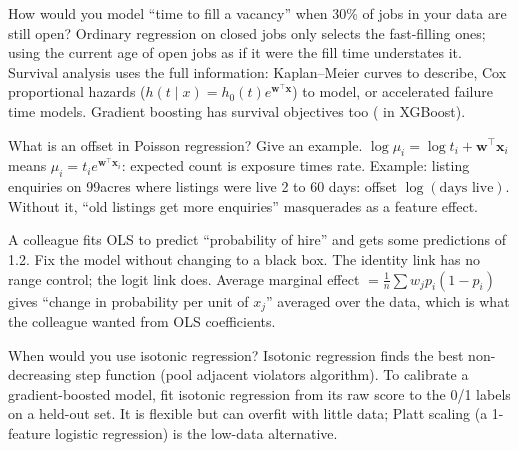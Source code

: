 \begin{qa}{\deep How would you model ``time to fill a vacancy'' when 30\% of jobs in your data are still open?}
\why Ordinary regression on closed jobs only selects the fast-filling ones; using the current age of open jobs as if it were
the fill time understates it. Survival analysis uses the full information: Kaplan--Meier curves to describe, Cox proportional
hazards ($h(t\mid x) = h_0(t)e^{\mathbf w^\top\mathbf x}$) to model, or accelerated failure time models. Gradient boosting has
survival objectives too ( in XGBoost).
\end{qa}

\begin{qa}{What is an offset in Poisson regression? Give an example.}
\why $\log\mu_i = \log t_i + \mathbf w^\top\mathbf x_i$ means $\mu_i = t_i e^{\mathbf w^\top\mathbf x_i}$: expected count is
exposure times rate. Example: listing enquiries on 99acres where listings were live 2 to 60 days: offset $\log(\text{days live})$.
Without it, ``old listings get more enquiries'' masquerades as a feature effect.
\end{qa}

\begin{qa}{\deep A colleague fits OLS to predict ``probability of hire'' and gets some predictions of 1.2. Fix the model
without changing to a black box.}
\why The identity link has no range control; the logit link does. Average marginal effect $= \frac1n\sum w_j p_i(1-p_i)$ gives
``change in probability per unit of $x_j$'' averaged over the data, which is what the colleague wanted from OLS coefficients.
\end{qa}

\begin{qa}{When would you use isotonic regression?}
\why Isotonic regression finds the best non-decreasing step function (pool adjacent violators algorithm). To calibrate a
gradient-boosted model, fit isotonic regression from its raw score to the 0/1 labels on a held-out set. It is flexible but can
overfit with little data; Platt scaling (a 1-feature logistic regression) is the low-data alternative.
\end{qa}

